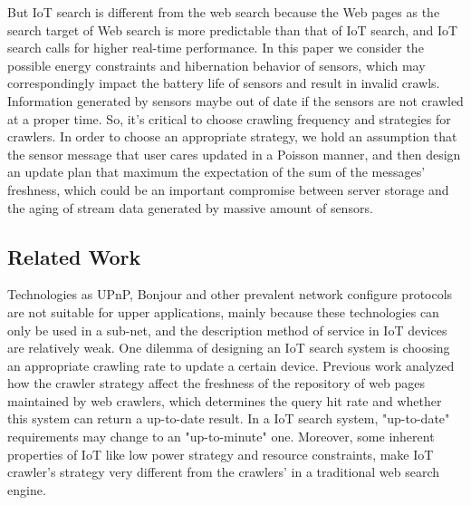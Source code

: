\documentclass[conference]{IEEEtran}
\begin{document}
But IoT search is different from the web search because the Web pages as the search target of Web search is more predictable than that of IoT search, and IoT search calls for higher real-time performance. In this paper we consider the possible energy constraints and hibernation behavior of sensors, which may correspondingly impact the battery life of sensors and result in invalid crawls.
Information generated by sensors maybe out of date if the sensors are not crawled at a proper time. So, it's critical to choose crawling frequency and strategies for crawlers. 
In order to choose an appropriate strategy, we hold an assumption that the sensor message that user cares updated in a Poisson manner, and then design an update plan that maximum the expectation of the sum of the messages' freshness, which could be an important compromise between server storage and the aging of stream data generated by massive amount of sensors.

\subsection{Related Work}
Technologies as UPnP\cite{UPnP}, Bonjour\cite{Bonjour} and other prevalent network configure protocols are not suitable for upper applications, mainly because these technologies can only be used in a sub-net, and the description method of service in IoT devices are relatively weak.
%
One dilemma of designing an IoT search system is choosing an appropriate crawling rate to update a certain device. Previous work\cite{Cho2000}\cite{Wolf2002}\cite{Challenger2004} analyzed how the crawler strategy affect the freshness of the repository of web pages maintained by web crawlers, which determines the query hit rate and whether this system can return a up-to-date result.
In a IoT search system, "up-to-date" requirements may change to an "up-to-minute" one. Moreover, some inherent properties of IoT like low power strategy and resource constraints, make IoT crawler's strategy very different from the crawlers' in a traditional web search engine. 
\end{document}
